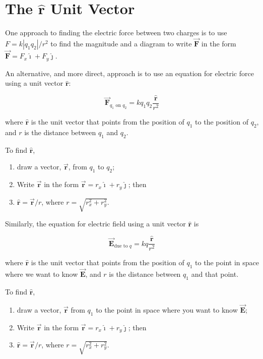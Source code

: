 \documentclass{article}
\newcommand{\ihat}[0]{\hat{\boldsymbol{\imath}}}
\newcommand{\jhat}[0]{\hat{\boldsymbol{\jmath}}}
\newcommand{\rhat}[0]{\hat{\mathbf{r}}}
\newcommand{\bfvec}[1]{\vec{\mathbf{#1}}}
\begin{document}

\section{The $\rhat$ Unit Vector}

One approach to finding the electric force between two charges is to use
$F=k{|q_1q_2|}/{r^2}$ to find the magnitude and a diagram to write $\bfvec{F}$ in the form $\bfvec{F}=F_x\ihat + F_y\jhat$.

An alternative, and more direct, approach is to use an equation for electric force using a unit vector $\rhat$:

$$\bfvec{F}_{q_1\text{ on }q_2}=kq_1q_2\frac{\rhat}{r^2}$$

where $\rhat$ is the unit vector that points from the position of $q_1$ to the position of $q_2$, and $r$ is the distance between $q_1$ and $q_2$.

To find $\rhat$, 

\begin{enumerate}

  \item draw a vector, $\bfvec{r}$, from $q_1$ to $q_2$;

  \item Write $\bfvec{r}$ in the form $\bfvec{r}=r_x\ihat+r_y\jhat$; then

  \item $\rhat=\bfvec{r}/r$, where $r=\sqrt{r_x^2+r_y^2}$.

\end{enumerate}

Similarly, the equation for electric field using a unit vector $\rhat$ is

$$\bfvec{E}_{\text{due to }q}=kq\frac{\rhat}{r^2}$$

where $\rhat$ is the unit vector that points from the position of $q_1$ to the point in space where we want to know $\bfvec{E}$, and $r$ is the distance between $q_1$ and that point. 

To find $\rhat$, 

\begin{enumerate}

  \item draw a vector, $\bfvec{r}$ from $q_1$ to the point in space where you want to know $\bfvec{E}$;

  \item Write $\bfvec{r}$ in the form $\bfvec{r}=r_x\ihat+r_y\jhat$; then

  \item $\rhat=\bfvec{r}/r$, where $r=\sqrt{r_x^2+r_y^2}$.

\end{enumerate}
\end{document}

